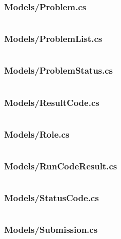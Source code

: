 \documentclass[a4paper]{report}
\begin{document}
\inputminted{csharp}{"../src/Algorithm Dynamics.Core/Models/Language.cs"}

\subsubsection{Models/Problem.cs}

\inputminted{csharp}{"../src/Algorithm Dynamics.Core/Models/Problem.cs"}

\subsubsection{Models/ProblemList.cs}

\inputminted{csharp}{"../src/Algorithm Dynamics.Core/Models/ProblemList.cs"}

\subsubsection{Models/ProblemStatus.cs}

\inputminted{csharp}{"../src/Algorithm Dynamics.Core/Models/ProblemStatus.cs"}

\subsubsection{Models/ResultCode.cs}

\inputminted{csharp}{"../src/Algorithm Dynamics.Core/Models/ResultCode.cs"}

\subsubsection{Models/Role.cs}

\inputminted{csharp}{"../src/Algorithm Dynamics.Core/Models/Role.cs"}

\subsubsection{Models/RunCodeResult.cs}

\inputminted{csharp}{"../src/Algorithm Dynamics.Core/Models/RunCodeResult.cs"}

\subsubsection{Models/StatusCode.cs}

\inputminted{csharp}{"../src/Algorithm Dynamics.Core/Models/StatusCode.cs"}

\subsubsection{Models/Submission.cs}
\end{document}
